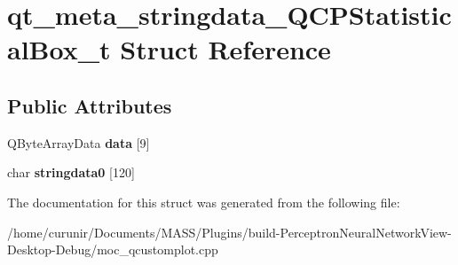 \hypertarget{structqt__meta__stringdata___q_c_p_statistical_box__t}{}\section{qt\+\_\+meta\+\_\+stringdata\+\_\+\+Q\+C\+P\+Statistical\+Box\+\_\+t Struct Reference}
\label{structqt__meta__stringdata___q_c_p_statistical_box__t}
\subsection*{Public Attributes}
\begin{DoxyCompactItemize}
\item 
Q\+Byte\+Array\+Data {\bfseries data} \mbox{[}9\mbox{]}\hypertarget{structqt__meta__stringdata___q_c_p_statistical_box__t_a4da073c461b75439babf89f1a883b091}{}\label{structqt__meta__stringdata___q_c_p_statistical_box__t_a4da073c461b75439babf89f1a883b091}

\item 
char {\bfseries stringdata0} \mbox{[}120\mbox{]}\hypertarget{structqt__meta__stringdata___q_c_p_statistical_box__t_a1cda43a559b6896254cc1ae2ff88fe83}{}\label{structqt__meta__stringdata___q_c_p_statistical_box__t_a1cda43a559b6896254cc1ae2ff88fe83}

\end{DoxyCompactItemize}


The documentation for this struct was generated from the following file\+:\begin{DoxyCompactItemize}
\item 
/home/curunir/\+Documents/\+M\+A\+S\+S/\+Plugins/build-\/\+Perceptron\+Neural\+Network\+View-\/\+Desktop-\/\+Debug/moc\+\_\+qcustomplot.\+cpp\end{DoxyCompactItemize}
